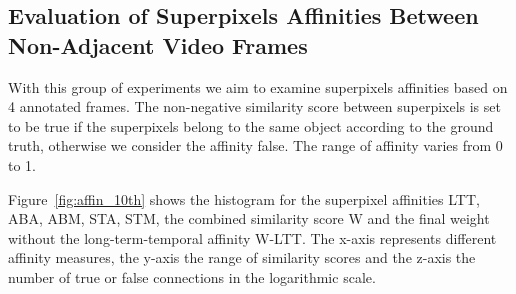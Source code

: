 \subsection{Evaluation of Superpixels Affinities Between Non-Adjacent Video Frames}
With this group of experiments we aim to examine superpixels affinities based on 4 annotated frames.
The non-negative similarity score between superpixels is set to be true if the superpixels belong to the same object according to the ground truth, otherwise we consider the affinity false.  
The range of affinity varies from 0 to 1.

Figure~\ref{fig:affin_10th} shows the histogram for the superpixel affinities LTT, ABA, ABM, STA, STM, the combined similarity score W and the final weight without the long-term-temporal 
affinity W-LTT. The x-axis represents different affinity measures, the y-axis the range of similarity scores and the z-axis the number of true or false connections in the logarithmic scale.

